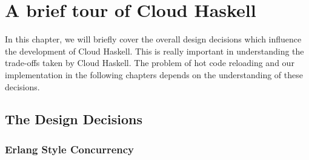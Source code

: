 
\chapter{A brief tour of Cloud Haskell }
\label{chap:cloudhaskell}

In this chapter, we will briefly cover the overall design decisions
which influence the development of Cloud Haskell. This is really
important in understanding the trade-offs taken by Cloud Haskell. The
problem of hot code reloading and our implementation in the following
chapters depends on the understanding of these decisions.

\section{The Design Decisions}

\subsection{Erlang Style Concurrency}


